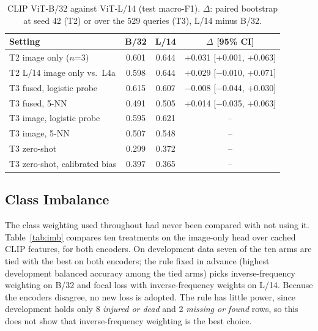 \documentclass[conference]{IEEEtran}
\begin{document}
\begin{table}[t]
\centering
\caption{CLIP ViT-B/32 against ViT-L/14 (test macro-F1). $\Delta$: paired bootstrap at seed 42 (T2) or over the 529 queries (T3), L/14 minus B/32.}
\label{tab:scale}
\footnotesize
\setlength{\tabcolsep}{3pt}
\begin{tabular}{lccc}
\toprule
Setting & B/32 & L/14 & $\Delta$ [95\% CI] \\
\midrule
T2 image only ($n$=3) & 0.601 & 0.644 & +0.031 [+0.001, +0.063] \\
T2 L/14 image only vs.\ L4a & 0.598 & 0.644 & +0.029 [$-$0.010, +0.071] \\
T3 fused, logistic probe & 0.615 & 0.607 & $-$0.008 [$-$0.044, +0.030] \\
T3 fused, 5-NN & 0.491 & 0.505 & +0.014 [$-$0.035, +0.063] \\
T3 image, logistic probe & 0.595 & 0.621 & -- \\
T3 image, 5-NN & 0.507 & 0.548 & -- \\
T3 zero-shot & 0.299 & 0.372 & -- \\
T3 zero-shot, calibrated bias & 0.397 & 0.365 & -- \\
\bottomrule
\end{tabular}
\end{table}

\subsection{Class Imbalance}
\label{sec:imbalance}
The class weighting used throughout had never been compared with not using it. Table~\ref{tab:imb} compares ten treatments on the image-only head over cached CLIP features, for both encoders. On development data seven of the ten arms are tied with the best on both encoders; the rule fixed in advance (highest development balanced accuracy among the tied arms) picks inverse-frequency weighting on B/32 and focal loss with inverse-frequency weights on L/14. Because the encoders disagree, no new loss is adopted. The rule has little power, since development holds only 8 \emph{injured or dead} and 2 \emph{missing or found} rows, so this does not show that inverse-frequency weighting is the best choice.
\end{document}

